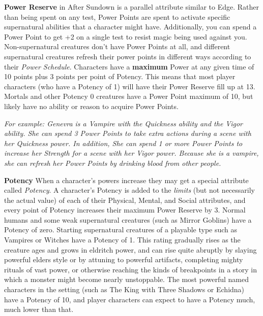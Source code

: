 \textbf{Power Reserve} in After Sundown is a parallel attribute similar to Edge. Rather than being spent on any test, Power Points are spent to activate specific supernatural abilities that a character might have. Additionally, you can spend a Power Point to get +2 on a single test to resist magic being used against you. Non-supernatural creatures don't have Power Points at all, and different supernatural creatures refresh their power points in different ways according to their \textit{Power Schedule}. Characters have a \textbf{maximum} Power at any given time of 10 points plus 3 points per point of Potency. This means that most player characters (who have a Potency of 1) will have their Power Reserve fill up at 13. Mortals and other Potency 0 creatures have a Power Point maximum of 10, but likely have no ability or reason to acquire Power Points.

\medskip

\textit{For example: Genevra is a Vampire with the Quickness ability and the Vigor ability. She can spend 3 Power Points to take extra actions during a scene with her Quickness power. In addition,  She can spend 1 or more Power Points to increase her Strength for a scene with her Vigor power. Because she is a vampire, she can refresh her Power Points by drinking blood from other people.}

\medskip

\textbf{Potency} When a character's powers increase they may get a special attribute called \textit{Potency}. A character's Potency is added to the \textit{limits} (but not necessarily the actual value) of each of their Physical, Mental, and Social attributes, and every point of Potency increases their maximum Power Reserve by 3. Normal humans and some weak supernatural creatures (such as Mirror Goblins) have a Potency of zero. Starting supernatural creatures of a playable type such as Vampires or Witches have a Potency of 1. This rating gradually rises as the creature ages and grows in eldritch power, and can rise quite abruptly by slaying powerful elders  style or by attuning to powerful artifacts, completing mighty rituals of vast power, or otherwise reaching the kinds of breakpoints in a story in which a monster might become nearly unstoppable. The most powerful named characters in the setting (such as The King with Three Shadows or Echidna) have a Potency of 10, and player characters can expect to have a Potency much, much lower than that.

